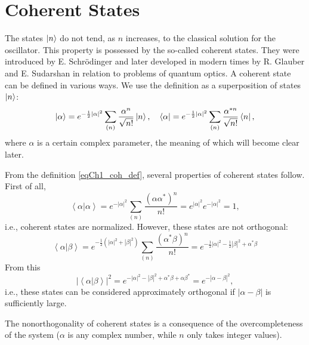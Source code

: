 \section{Coherent States}
The states $\ket{n}$ do not tend, as $n$ increases, to the classical solution for the oscillator. This property is possessed by the so-called coherent states. They were introduced by E. Schrödinger and later developed in modern times by R. Glauber
\cite{bQuantumOpticsAndRadioPhisicsLecture1966} and E. Sudarshan 
\cite{bKaluderSudershan1970} in relation to problems of quantum optics. A coherent state can be defined in various ways. We use the definition as a superposition of states
$\ket{n}$:
\begin{equation}
\left|\alpha\right> = e^{-\frac{1}{2} \left|\alpha\right|^2}
\sum_{(n)} \frac{\alpha^n}{\sqrt{n!}}\ket{n},
\quad
\left<\alpha\right| = e^{-\frac{1}{2} \left|\alpha\right|^2}
\sum_{(n)} \frac{\alpha^{*n}}{\sqrt{n!}}\bra{n},
\label{eqCh1_coh_def}
\end{equation}
where $\alpha$ is a certain complex parameter, the meaning of which will become clear later. 

From the definition \eqref{eqCh1_coh_def}, several properties of coherent states follow. First of all,
\begin{equation}
\left<\alpha\right|\left.\alpha\right> = 
e^{-\left|\alpha\right|^2}\sum_{(n)}
\frac{\left(\alpha\alpha^{*}\right)^n}{n!} = 
e^{\left|\alpha\right|^2} e^{-\left|\alpha\right|^2} = 1,
\end{equation}
i.e., coherent states are normalized. However, these states are not orthogonal:
\begin{equation}
\left<\alpha\right|\left.\beta\right> = 
e^{-\frac{1}{2}\left(\left|\alpha\right|^2 +
  \left|\beta\right|^2\right)}\sum_{(n)} 
\frac{\left(\alpha^{*}\beta\right)^n}{n!} = 
e^{
-\frac{1}{2} \left|\alpha\right|^2  -\frac{1}{2} \left|\beta\right|^2
+
\alpha^{*} \beta 
}
\label{eqCh1_ortog}
\end{equation}
From this
\begin{equation}
\left|\left<\alpha\right|\left.\beta\right>\right|^2 = 
e^{
-\left|\alpha\right|^2  - \left|\beta\right|^2
+
\alpha^{*} \beta  + \alpha \beta^{*}} = 
e^{-\left|\alpha - \beta\right|^2}, 
\end{equation}
i.e., these states can be considered approximately orthogonal if
$\left|\alpha - \beta\right|$ is sufficiently large. 

The nonorthogonality of coherent states is a consequence of the overcompleteness of the system ($\alpha$ is any complex number, while $n$ only takes integer values). 

